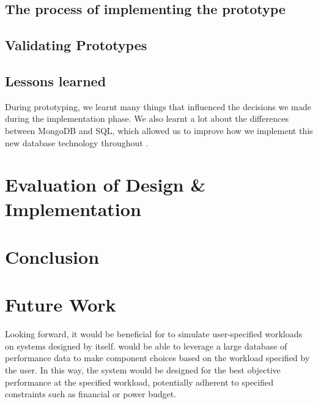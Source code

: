 \documentclass[11pt]{article}
\begin{document}
	\subsection{The process of implementing the prototype}

	\subsection{Validating Prototypes}

	\subsection{Lessons learned}
		During prototyping, we learnt many things that influenced the decisions we made during the implementation phase.
		We also learnt a lot about the differences between MongoDB and SQL, which allowed us to improve how we implement this new database technology throughout \opendc{}.

\section{Evaluation of Design \& Implementation}


\section{Conclusion} \label{sec:conclusion}

\section{Future Work}
	Looking forward, it would be beneficial for \opendc{} to simulate user-specified workloads on systems designed by \opendc{} itself. 
	\opendc{} would be able to leverage a large database of performance data to make component choices based on the workload specified by the user. 
	In this way, the system would be designed for the best objective performance at the specified workload, potentially adherent to specified constraints such as financial or power budget.


\newpage


\end{document}

